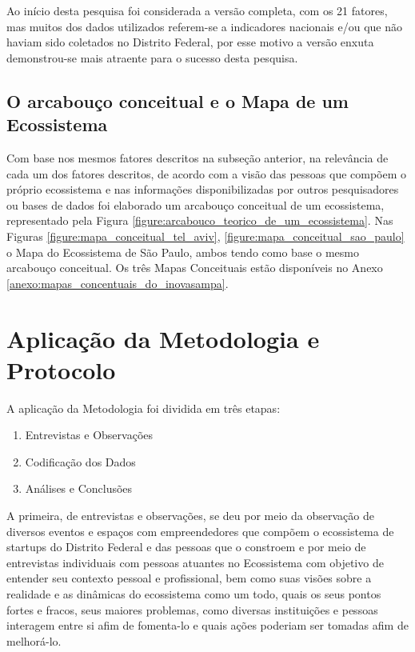 Ao início desta pesquisa foi considerada a versão completa, com os 21 fatores, mas muitos dos dados utilizados referem-se a indicadores nacionais e/ou que não haviam sido coletados no Distrito Federal, por esse motivo a versão enxuta demonstrou-se mais atraente para o sucesso desta pesquisa.

\subsection{O arcabouço conceitual e o Mapa de um Ecossistema}
\label{subsection:arcabouco_conceitual_e_modelo}

Com base nos mesmos fatores descritos na subseção anterior, na relevância de cada um dos fatores descritos, de acordo com a visão das pessoas que compõem o próprio ecossistema e nas informações disponibilizadas por outros pesquisadores ou bases de dados foi elaborado um arcabouço conceitual de um ecossistema, representado pela Figura \ref{figure:arcabouco_teorico_de_um_ecossistema}. Nas Figuras \ref{figure:mapa_conceitual_tel_aviv}, \ref{figure:mapa_conceitual_sao_paulo} o Mapa do Ecossistema de São Paulo, ambos tendo como base o mesmo arcabouço conceitual. Os três Mapas Conceituais estão disponíveis no Anexo \ref{anexo:mapas_concentuais_do_inovasampa}.

\section{Aplicação da Metodologia e Protocolo}
\label{section:aplicacao_da_metodologia}

A aplicação da Metodologia foi dividida em três etapas:

\begin{enumerate}
  \item Entrevistas e Observações
  \item Codificação dos Dados
  \item Análises e Conclusões
\end{enumerate}

A primeira, de entrevistas e observações, se deu por meio da observação de diversos eventos e espaços com empreendedores que compõem o ecossistema de startups do Distrito Federal e das pessoas que o constroem e por meio de entrevistas individuais com pessoas atuantes no Ecossistema com objetivo de entender seu contexto pessoal e profissional, bem como suas visões sobre a realidade e as dinâmicas do ecossistema como um todo, quais os seus pontos fortes e fracos, seus maiores problemas, como diversas instituições e pessoas interagem entre si afim de fomenta-lo e quais ações poderiam ser tomadas afim de melhorá-lo.

